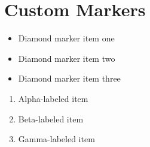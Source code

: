\documentclass[12pt]{article}
\begin{document}
\section{Custom Markers}
\begin{itemize}[label=$\diamond$]
    \item Diamond marker item one
    \item Diamond marker item two
    \item Diamond marker item three
\end{itemize}

\begin{enumerate}[label=\alph*)]
    \item Alpha-labeled item
    \item Beta-labeled item
    \item Gamma-labeled item
\end{enumerate}
\end{document}
